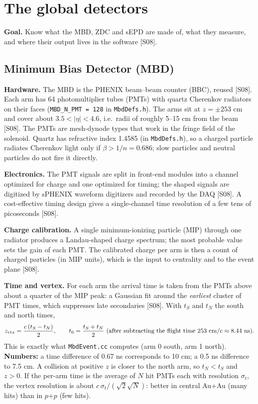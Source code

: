 \documentclass[11pt,letterpaper]{article}
\newcommand{\goal}[1]{\noindent\textbf{Goal.} #1\par}
\begin{document}
\section{The global detectors}\label{sec:global}
\goal{Know what the MBD, ZDC and sEPD are made of, what they measure, and where their output lives in the software [S08].}

\subsection{Minimum Bias Detector (MBD)}
\textbf{Hardware.} The MBD is the PHENIX beam--beam counter (BBC), reused [S08]. Each arm has 64 photomultiplier tubes
(PMTs) with quartz Cherenkov radiators on their faces (\texttt{MBD\_N\_PMT = 128} in \texttt{MbdDefs.h}). The arms sit at
$z=\pm253$ cm and cover about $3.5<|\eta|<4.6$, i.e.\ radii of roughly 5--15 cm from the beam [S08]. The PMTs are mesh-dynode
types that work in the fringe field of the solenoid. Quartz has refractive index 1.4585 (in \texttt{MbdDefs.h}), so a charged
particle radiates Cherenkov light only if $\beta>1/n=0.686$; slow particles and neutral particles do not fire it directly.

\textbf{Electronics.} The PMT signals are split in front-end modules into a channel optimized for charge and one optimized for
timing; the shaped signals are digitized by sPHENIX waveform digitizers and recorded by the DAQ [S08]. A cost-effective
timing design gives a single-channel time resolution of a few tens of picoseconds [S08].

\textbf{Charge calibration.} A single minimum-ionizing particle (MIP) through one radiator produces a Landau-shaped charge
spectrum; the most probable value sets the gain of each PMT. The calibrated charge per arm is then a count of charged particles
(in MIP units), which is the input to centrality and to the event plane [S08].

\textbf{Time and vertex.} For each arm the arrival time is taken from the PMTs above about a quarter of the MIP peak: a
Gaussian fit around the \emph{earliest} cluster of PMT times, which suppresses late secondaries [S08]. With $t_S$ and $t_N$
the south and north times,
\begin{equation}
z_{\rm vtx}=\frac{c\,(t_S-t_N)}{2},\qquad t_0=\frac{t_S+t_N}{2}\ (\text{after subtracting the flight time } 253\ \mathrm{cm}/c\approx8.44\ \mathrm{ns}).
\label{eq:mbdz}
\end{equation}
This is exactly what \texttt{MbdEvent.cc} computes (arm 0 south, arm 1 north). \textbf{Numbers:} a time difference of 0.67 ns
corresponds to 10 cm; a 0.5 ns difference to 7.5 cm. A collision at positive $z$ is closer to the north arm, so $t_N<t_S$ and
$z>0$. If the per-arm time is the average of $N$ hit PMTs each with resolution $\sigma_t$, the vertex resolution is about
$c\,\sigma_t/(\sqrt2\sqrt N)$: better in central Au+Au (many hits) than in $p$+$p$ (few hits).
\end{document}
